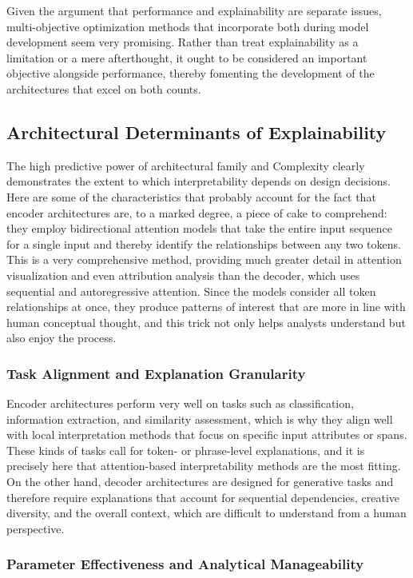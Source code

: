 \documentclass[preprint,12pt]{elsarticle}
\begin{document}
Given the argument that performance and explainability are separate issues, multi-objective optimization methods that incorporate both during model development seem very promising. Rather than treat explainability as a limitation or a mere afterthought, it ought to be considered an important objective alongside performance, thereby fomenting the development of the architectures that excel on both counts.

\subsection{Architectural Determinants of Explainability}

The high predictive power of architectural family and Complexity clearly demonstrates the extent to which interpretability depends on design decisions. Here are some of the characteristics that probably account for the fact that encoder architectures are, to a marked degree, a piece of cake to comprehend: they employ bidirectional attention models that take the entire input sequence for a single input and thereby identify the relationships between any two tokens.
This is a very comprehensive method, providing much greater detail in attention visualization and even attribution analysis than the decoder, which uses sequential and autoregressive attention. Since the models consider all token relationships at once, they produce patterns of interest that are more in line with human conceptual thought, and this trick not only helps analysts understand but also enjoy the process.

\subsubsection{Task Alignment and Explanation Granularity}

Encoder architectures perform very well on tasks such as classification, information extraction, and similarity assessment, which is why they align well with local interpretation methods that focus on specific input attributes or spans. These kinds of tasks call for token- or phrase-level explanations, and it is precisely here that attention-based interpretability methods are the most fitting. On the other hand, decoder architectures are designed for generative tasks and therefore require explanations that account for sequential dependencies, creative diversity, and the overall context, which are difficult to understand from a human perspective.

\subsubsection{Parameter Effectiveness and Analytical Manageability}
\end{document}
